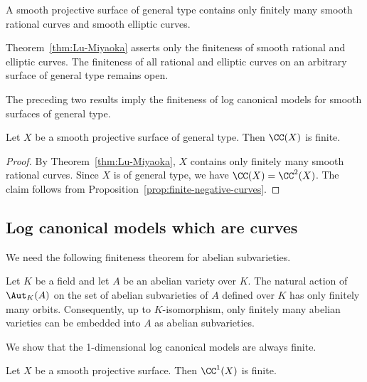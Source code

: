 \documentclass[12pt]{amsart}
\begin{document}
\begin{theorem}[{\cite[Corollary~1]{LM95}}]\label{thm:Lu-Miyaoka}
A smooth projective surface of general type contains only finitely many smooth rational curves and smooth elliptic curves.
\end{theorem}

\begin{remark}
Theorem~\ref{thm:Lu-Miyaoka} asserts only the finiteness of smooth
rational and elliptic curves. The finiteness of all rational and
elliptic curves on an arbitrary surface of general type remains open.
\end{remark}

The preceding two results imply the finiteness of log canonical models
for smooth surfaces of general type.

\begin{theorem}\label{thm:general-type-surface}
Let $X$ be a smooth projective surface of general type. Then $\CC(X)$
is finite.
\end{theorem}

\begin{proof}
By Theorem~\ref{thm:Lu-Miyaoka}, $X$ contains only finitely many smooth
rational curves. Since $X$ is of general type, we have
$\CC(X)=\CC^2(X)$. The claim follows from
Proposition~\ref{prop:finite-negative-curves}.
\end{proof}


\subsection{Log canonical models which are curves}

We need the following finiteness theorem for abelian subvarieties.

\begin{theorem}\label{thm:loz}
Let $K$ be a field and let $A$ be an abelian variety over $K$. The natural action of $\Aut_K(A)$ on the set of abelian subvarieties of $A$ defined over $K$ has only finitely many orbits. Consequently, up to $K$-isomorphism, only finitely many abelian varieties can be embedded into $A$ as abelian subvarieties.
\end{theorem}

We show that the 1-dimensional log canonical models are always finite.

\begin{theorem}\label{thm:curve-targets}
Let $X$ be a smooth projective surface. Then $\CC^1(X)$ is finite.
\end{theorem}
\end{document}
